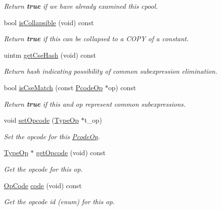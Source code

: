 \begin{DoxyCompactItemize}
\begin{DoxyCompactList}\small\item\em Return {\bfseries{true}} if we have already examined this cpool. \end{DoxyCompactList}\item 
bool \mbox{\hyperlink{class_pcode_op_abd972b908036802cebc2c3fa5256a9f9}{is\+Collapsible}} (void) const
\begin{DoxyCompactList}\small\item\em Return {\bfseries{true}} if this can be collapsed to a C\+O\+PY of a constant. \end{DoxyCompactList}\item 
uintm \mbox{\hyperlink{class_pcode_op_a9993dd93bcad16183589a46404c5961f}{get\+Cse\+Hash}} (void) const
\begin{DoxyCompactList}\small\item\em Return hash indicating possibility of common subexpression elimination. \end{DoxyCompactList}\item 
bool \mbox{\hyperlink{class_pcode_op_a241ccdd57a457b6114aaaaad5ac0d5fa}{is\+Cse\+Match}} (const \mbox{\hyperlink{class_pcode_op}{Pcode\+Op}} $\ast$op) const
\begin{DoxyCompactList}\small\item\em Return {\bfseries{true}} if this and {\itshape op} represent common subexpressions. \end{DoxyCompactList}\item 
void \mbox{\hyperlink{class_pcode_op_a2a7f9232bab2d185644c3dd0d536ff1b}{set\+Opcode}} (\mbox{\hyperlink{class_type_op}{Type\+Op}} $\ast$t\+\_\+op)
\begin{DoxyCompactList}\small\item\em Set the opcode for this \mbox{\hyperlink{class_pcode_op}{Pcode\+Op}}. \end{DoxyCompactList}\item 
\mbox{\hyperlink{class_type_op}{Type\+Op}} $\ast$ \mbox{\hyperlink{class_pcode_op_a1aa053ae15310104954779d0021c63ca}{get\+Opcode}} (void) const
\begin{DoxyCompactList}\small\item\em Get the opcode for this op. \end{DoxyCompactList}\item 
\mbox{\hyperlink{opcodes_8hh_abeb7dfb0e9e2b3114e240a405d046ea7}{Op\+Code}} \mbox{\hyperlink{class_pcode_op_a4879c54b797d545d0cc149dd8bed7940}{code}} (void) const
\begin{DoxyCompactList}\small\item\em Get the opcode id (enum) for this op. \end{DoxyCompactList}\item 

\end{DoxyCompactItemize}
